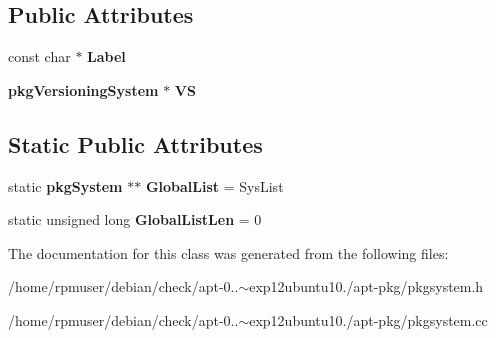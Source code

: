 \subsection*{\-Public \-Attributes}
\begin{DoxyCompactItemize}
\item 
const char $\ast$ {\bfseries \-Label}\label{classpkgSystem_a2c28600dbc88e9535c6e44b111829cc2}

\item 
{\bf pkg\-Versioning\-System} $\ast$ {\bfseries \-V\-S}\label{classpkgSystem_a3f4191ee956a08d06a8aecf064d03c1e}

\end{DoxyCompactItemize}
\subsection*{\-Static \-Public \-Attributes}
\begin{DoxyCompactItemize}
\item 
static {\bf pkg\-System} $\ast$$\ast$ {\bfseries \-Global\-List} = \-Sys\-List\label{classpkgSystem_a542925237c099179536321affde78ea6}

\item 
static unsigned long {\bfseries \-Global\-List\-Len} = 0\label{classpkgSystem_acdd1750df964c2a94afe622abfe15d7b}

\end{DoxyCompactItemize}


\-The documentation for this class was generated from the following files\-:\begin{DoxyCompactItemize}
\item 
/home/rpmuser/debian/check/apt-\/0..$\sim$exp12ubuntu10./apt-\/pkg/pkgsystem.\-h\item 
/home/rpmuser/debian/check/apt-\/0..$\sim$exp12ubuntu10./apt-\/pkg/pkgsystem.\-cc\end{DoxyCompactItemize}
